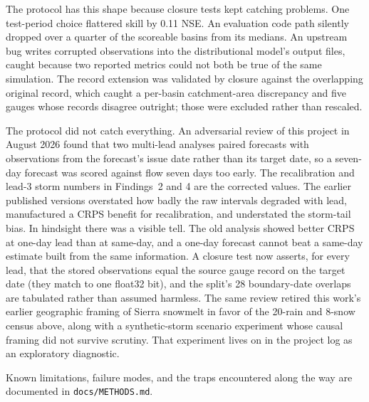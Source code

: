 \documentclass[11pt]{article}
\begin{document}
The protocol has this shape because closure tests kept catching problems. One test-period
choice flattered skill by 0.11 NSE. An evaluation code path silently dropped over a
quarter of the scoreable basins from its medians. An upstream bug writes corrupted
observations into the distributional model's output files, caught because two reported
metrics could not both be true of the same simulation. The record extension was validated
by closure against the overlapping original record, which caught a per-basin
catchment-area discrepancy and five gauges whose records disagree outright; those were
excluded rather than rescaled.

The protocol did not catch everything. An adversarial review of this project in August
2026 found that two multi-lead analyses paired forecasts with observations from the
forecast's issue date rather than its target date, so a seven-day forecast was scored
against flow seven days too early. The recalibration and lead-3 storm numbers in Findings~2
and 4 are the corrected values. The earlier published versions overstated how badly the raw
intervals degraded with lead, manufactured a CRPS benefit for recalibration, and
understated the storm-tail bias. In hindsight there was a visible tell. The old analysis
showed better CRPS at one-day lead than at same-day, and a one-day forecast cannot beat a
same-day estimate built from the same information. A closure test now asserts, for every
lead, that the stored observations equal the source gauge record on the target date (they
match to one float32 bit), and the split's 28 boundary-date overlaps are tabulated rather
than assumed harmless. The same review retired this work's earlier geographic framing of
Sierra snowmelt in favor of the 20-rain and 8-snow census above, along with a
synthetic-storm scenario experiment whose causal framing did not survive scrutiny. That
experiment lives on in the project log as an exploratory diagnostic.

Known limitations, failure modes, and the traps encountered along the way are documented in
\texttt{docs/METHODS.md}.



\end{document}
